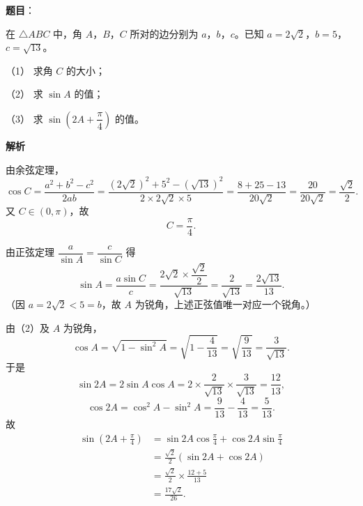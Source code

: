\begin{answer}

\textbf{题目}：

在 $\triangle ABC$ 中，角 $A$，$B$，$C$ 所对的边分别为 $a$，$b$，$c$。已知 $a=2\sqrt2$，$b=5$，$c=\sqrt{13}$。

（1） 求角 $C$ 的大小；

（2） 求 $\sin A$ 的值；

（3） 求 $\sin\left(2A+\dfrac\pi4\right)$ 的值。

\textbf{解析}


由余弦定理，
\nopagebreak[4]
\[\cos C=\frac{a^2+b^2-c^2}{2ab}=\frac{(2\sqrt2)^2+5^2-(\sqrt{13})^2}{2\times2\sqrt2\times5}=\frac{8+25-13}{20\sqrt2}=\frac{20}{20\sqrt2}=\frac{\sqrt2}2 .\]
又 $C\in(0,\pi)$，故
\nopagebreak[4]
\[C=\frac\pi4 .\]


由正弦定理 $\dfrac a{\sin A}=\dfrac c{\sin C}$ 得
\nopagebreak[4]
\[\sin A=\frac{a\sin C}{c}=\frac{2\sqrt2\times\dfrac{\sqrt2}2}{\sqrt{13}}=\frac{2}{\sqrt{13}}=\frac{2\sqrt{13}}{13} .\]
（因 $a=2\sqrt2<5=b$，故 $A$ 为锐角，上述正弦值唯一对应一个锐角。）


由（2）及 $A$ 为锐角，
\nopagebreak[4]
\[\cos A=\sqrt{1-\sin^2A}=\sqrt{1-\frac4{13}}=\sqrt{\frac9{13}}=\frac3{\sqrt{13}} .\]
于是
\nopagebreak[4]
\[\sin2A=2\sin A\cos A=2\times\frac2{\sqrt{13}}\times\frac3{\sqrt{13}}=\frac{12}{13},\]
\nopagebreak[4]
\[\cos2A=\cos^2A-\sin^2A=\frac9{13}-\frac4{13}=\frac5{13} .\]
故
\nopagebreak[4]
\[\begin{aligned}
\sin\left(2A+\frac\pi4\right)
&=\sin2A\cos\frac\pi4+\cos2A\sin\frac\pi4\\
&=\frac{\sqrt2}2\left(\sin2A+\cos2A\right)\\
&=\frac{\sqrt2}2\times\frac{12+5}{13}\\
&=\frac{17\sqrt2}{26} .
\end{aligned}\]




\end{answer}
